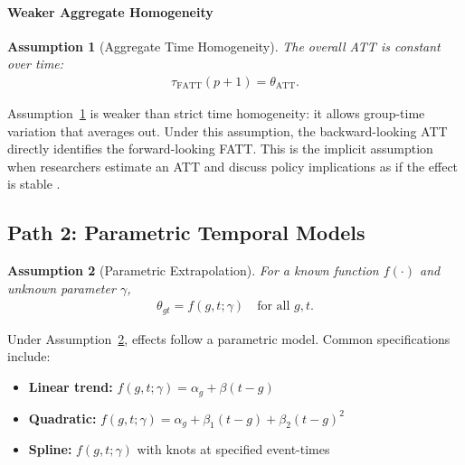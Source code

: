\documentclass{article}
\newtheorem{assumption}{Assumption}
\begin{document}
\paragraph{Weaker Aggregate Homogeneity}


\begin{assumption}[Aggregate Time Homogeneity]
\label{assump:aggregate-homogeneity}
The overall ATT is constant over time:
\begin{align}
\tau_{\text{FATT}}(p+1) = \theta_{\text{ATT}}.
\end{align}
\end{assumption}

Assumption~\ref{assump:aggregate-homogeneity} is weaker than strict time homogeneity: it allows group-time variation that averages out. Under this assumption, the backward-looking ATT directly identifies the forward-looking FATT. This is the implicit assumption when researchers estimate an ATT and discuss policy implications as if the effect is stable \citep{gablerDealingHeterogeneityTreatment2009}.

\subsection{Path 2: Parametric Temporal Models}
\label{sec:path2}


\begin{assumption}[Parametric Extrapolation]
\label{assump:parametric}
For a known function $f(\cdot)$ and unknown parameter $\gamma$,
\begin{align}
\theta_{gt} = f(g,t;\gamma) \quad \text{for all } g, t.
\end{align}
\end{assumption}

Under Assumption~\ref{assump:parametric}, effects follow a parametric model. Common specifications include:
\begin{itemize}
\item \textbf{Linear trend:} $f(g,t;\gamma) = \alpha_g + \beta(t-g)$
\item \textbf{Quadratic:} $f(g,t;\gamma) = \alpha_g + \beta_1(t-g) + \beta_2(t-g)^2$
\item \textbf{Spline:} $f(g,t;\gamma)$ with knots at specified event-times
\end{itemize}
\end{document}
